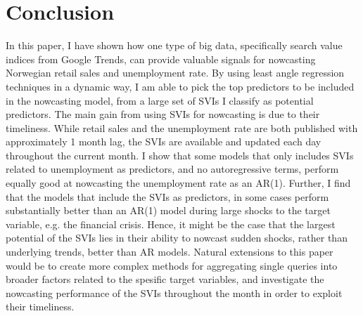 \section{Conclusion}\label{conclusion}

In this paper, I have shown how one type of big data, specifically search value indices from Google Trends, can provide valuable signals for nowcasting Norwegian retail sales and unemployment rate. By using least angle regression techniques in a dynamic way, I am able to pick the top predictors to be included in the nowcasting model, from a large set of SVIs I classify as potential predictors. The main gain from using SVIs for nowcasting is due to their timeliness. While retail sales and the unemployment rate are both published with approximately 1 month lag, the SVIs are available and updated each day throughout the current month. I show that some models that only includes SVIs related to unemployment as predictors, and no autoregressive terms, perform equally good at nowcasting the unemployment rate as an AR(1). Further, I find that the models that include the SVIs as predictors, in some cases perform substantially better than an AR(1) model during large shocks to the target variable, e.g. the financial crisis. Hence, it might be the case that the largest potential of the SVIs lies in their ability to nowcast sudden shocks, rather than underlying trends, better than AR models. Natural extensions to this paper would be to create more complex methods for aggregating single queries into broader factors related to the spesific target variables, and investigate the nowcasting performance of the SVIs throughout the month in order to exploit their timeliness.